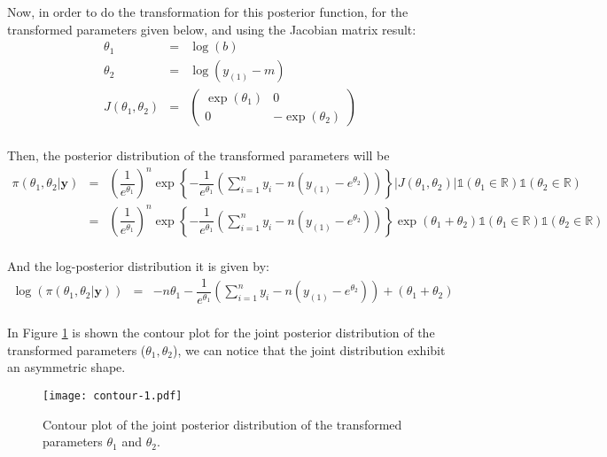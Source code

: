 \documentclass[a4paper, 11pt]{article}
\begin{document}
Now, in order to do the transformation for this posterior function, for the transformed parameters given below, and using the Jacobian matrix result:
\begin{equation*}
\begin{array}{rclll}
\theta_1 & = & \log (b) \\
\theta_2 & = & \log(y_{(1)} - m) \\
J(\theta_1, \theta_2) & = & \left(
    \begin{array}{cc}
      \exp(\theta_1)  & 0\\
      0 &  -\exp(\theta_2) 
    \end{array}
        \right) \\
\end{array}
\end{equation*}

Then, the posterior distribution of the transformed parameters will be
\begin{equation*}
\begin{array}{lclll}
\pi(\theta_1,\theta_2|\textbf{y}) & = & \left(\dfrac{1}{e^{\theta_1}}\right)^n \exp\left\{-\dfrac{1}{e^{\theta_1}}\left(\displaystyle\sum_{i=1}^{n}y_i - n(y_{(1)} - e^{\theta_2})\right)\right\} | J(\theta_1, \theta_2) | \mathds{1} \left(\theta_1\in\mathds{R}\right) \mathds{1} \left(\theta_2\in\mathds{R}\right) \\
& = & \left(\dfrac{1}{e^{\theta_1}}\right)^n \exp\left\{-\dfrac{1}{e^{\theta_1}}\left(\displaystyle\sum_{i=1}^{n}y_i - n(y_{(1)} - e^{\theta_2})\right)\right\} \exp (\theta_1 + \theta_2) \mathds{1} \left(\theta_1\in\mathds{R}\right) \mathds{1} \left(\theta_2\in\mathds{R}\right) \\
\end{array}
\end{equation*}

And the log-posterior distribution it is given by:
\begin{equation*}
\begin{array}{lclll}
\log(\pi(\theta_1,\theta_2|\textbf{y})) & = & -n\theta_1 -\dfrac{1}{e^{\theta_1}}\left(\displaystyle\sum_{i=1}^{n}y_i - n(y_{(1)} - e^{\theta_2})\right) +(\theta_1 + \theta_2) \\
\end{array}
\end{equation*}

In Figure \ref{fig1} is shown the contour plot for the joint posterior distribution of the transformed parameters ($\theta_1,\theta_2$), we can notice that the joint distribution exhibit an asymmetric shape.
\begin{figure}[H]
\centering
\caption{Contour plot of the joint posterior distribution of the transformed parameters $\theta_1$ and $\theta_2$.}
\label{fig1}
\texttt{[image: contour-1.pdf]}
\end{figure}
\end{document}
